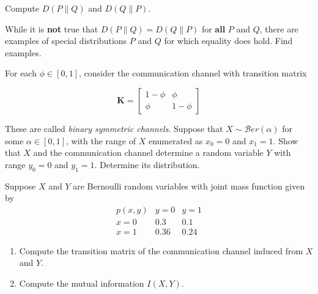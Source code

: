 \documentclass[12pt,reqno]{amsart}
\begin{document}
Compute $D( P \parallel Q)$ and $D(Q\parallel P)$.











\vfill
\prob While it is \textbf{not} true that $D(P\parallel Q) = D(Q \parallel P)$ for \textbf{all} $P$ and $Q$, there are examples of special distributions $P$ and $Q$ for which equality does hold. Find examples.










\vfill
\newpage
\prob For each $\phi \in [0,1]$, consider the communication channel with transition matrix

	\[\mathbf{K} = \begin{bmatrix}
	1 - \phi & \phi \\
	\phi & 1-\phi
	\end{bmatrix}
	\]
	
These are called \textit{binary symmetric channels}. Suppose that $X \sim \mathcal{B}er(\alpha)$ for some $\alpha \in [0,1]$, with the range of $X$ enumerated as $x_0 = 0$ and $x_1=1$. Show that $X$ and the communication channel determine a random variable $Y$ with range $y_0=0$ and $y_1=1$. Determine its distribution.









\vfill
\prob Suppose $X$ and $Y$ are Bernoulli random variables with joint mass function given by
	\[\begin{array}{c|cc}
	p(x,y) & y=0 & y=1 \\ \hline
	x=0 & 0.3 & 0.1 \\ 
	x=1 & 0.36 & 0.24
	\end{array}
	\]
	
\bigskip
\begin{enumerate}
\item Compute the transition matrix of the communication channel induced from $X$ and $Y$.


\vfill
\item Compute the mutual information $I(X,Y)$.


\end{enumerate}

\vfill
\end{document}
